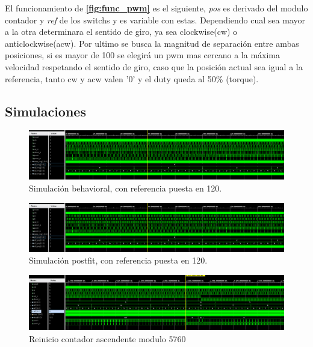 \documentclass[11pt, a4paper]{article}
\begin{document}
		El funcionamiento de \textcolor{blue}{\textbf{\ref{fig:func_pwm}}} es el siguiente, \textit{pos} es derivado del modulo contador y \textit{ref} de los switchs y es variable con estas. Dependiendo cual sea mayor a la otra determinara el sentido de giro, ya sea clockwise(cw) o anticlockwise(acw). Por ultimo se busca la magnitud de separación entre ambas posiciones, si es mayor de 100 se elegirá un pwm mas cercano a la máxima velocidad respetando el sentido de giro, caso que la posición actual sea igual a la referencia, tanto cw y acw valen '0' y el duty queda al 50\% (torque).

		\subsection{Simulaciones}
		\begin{figure}[H]
			\centering
			\includegraphics[width=\textwidth]{Imagenes/sim_impl_120.png}
			\caption{Simulación behavioral, con referencia puesta en 120.}
			\label{fig:sim_behav_pwm}
		\end{figure} 

		\begin{figure}[H]
			\centering
			\includegraphics[width=\textwidth]{Imagenes/sim_impl_120.png}
			\caption{Simulación postfit, con referencia puesta en 120.}
			\label{fig:sim_impl_pwm}
		\end{figure} 
		
		\begin{figure}[H]
			\centering
			\includegraphics[width=\textwidth]{Imagenes/sim_up.png}
			\caption{Reinicio contador ascendente modulo 5760}
			\label{fig:cont_up}
		\end{figure} 
		
\end{document}
